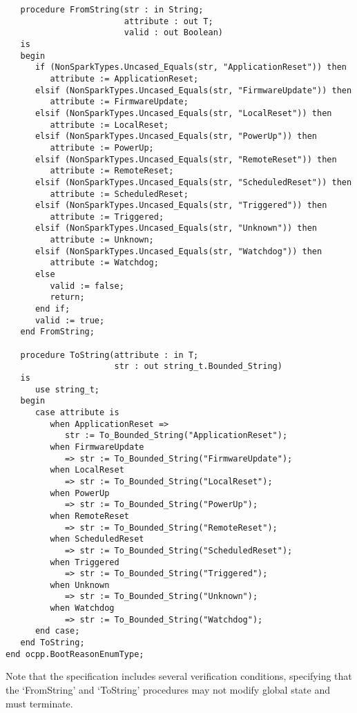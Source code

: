 \documentclass[12pt,openany,a4paper]{book}
\begin{document}
\begin{verbatim}
   procedure FromString(str : in String;
                        attribute : out T;
                        valid : out Boolean)
   is
   begin
      if (NonSparkTypes.Uncased_Equals(str, "ApplicationReset")) then
         attribute := ApplicationReset;
      elsif (NonSparkTypes.Uncased_Equals(str, "FirmwareUpdate")) then
         attribute := FirmwareUpdate;
      elsif (NonSparkTypes.Uncased_Equals(str, "LocalReset")) then
         attribute := LocalReset;
      elsif (NonSparkTypes.Uncased_Equals(str, "PowerUp")) then
         attribute := PowerUp;
      elsif (NonSparkTypes.Uncased_Equals(str, "RemoteReset")) then
         attribute := RemoteReset;
      elsif (NonSparkTypes.Uncased_Equals(str, "ScheduledReset")) then
         attribute := ScheduledReset;
      elsif (NonSparkTypes.Uncased_Equals(str, "Triggered")) then
         attribute := Triggered;
      elsif (NonSparkTypes.Uncased_Equals(str, "Unknown")) then
         attribute := Unknown;
      elsif (NonSparkTypes.Uncased_Equals(str, "Watchdog")) then
         attribute := Watchdog;
      else
         valid := false;
         return;
      end if;
      valid := true;
   end FromString;

   procedure ToString(attribute : in T;
                      str : out string_t.Bounded_String)
   is
      use string_t;
   begin
      case attribute is
         when ApplicationReset => 
         	str := To_Bounded_String("ApplicationReset");
         when FirmwareUpdate 
         	=> str := To_Bounded_String("FirmwareUpdate");
         when LocalReset 
         	=> str := To_Bounded_String("LocalReset");
         when PowerUp 
         	=> str := To_Bounded_String("PowerUp");
         when RemoteReset
         	=> str := To_Bounded_String("RemoteReset");
         when ScheduledReset 
         	=> str := To_Bounded_String("ScheduledReset");
         when Triggered 
         	=> str := To_Bounded_String("Triggered");
         when Unknown 
         	=> str := To_Bounded_String("Unknown");
         when Watchdog 
         	=> str := To_Bounded_String("Watchdog");
      end case;
   end ToString;
end ocpp.BootReasonEnumType;
\end{verbatim}

Note that the specification includes several verification conditions, specifying that the `FromString' and `ToString' procedures may not modify global state and must terminate.
\end{document}
